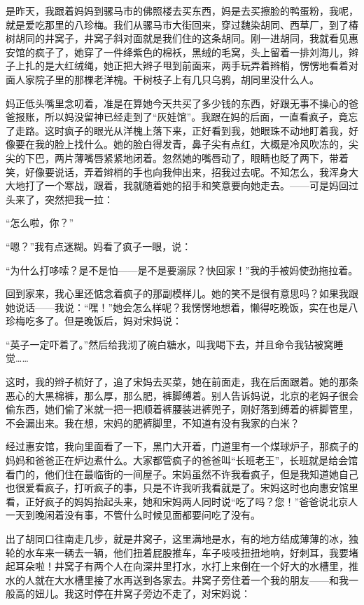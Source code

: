 \par 是昨天，我跟着妈妈到骡马市的佛照楼去买东西，妈是去买擦脸的鸭蛋粉，我呢，就是爱吃那里的八珍梅。我们从骡马市大街回来，穿过魏染胡同、西草厂，到了椿树胡同的井窝子，井窝子斜对面就是我们住的这条胡同。刚一进胡同，我就看见惠安馆的疯子了，她穿了一件绛紫色的棉袄，黑绒的毛窝，头上留着一排刘海儿，辫子上扎的是大红绒绳，她正把大辫子甩到前面来，两手玩弄着辫梢，愣愣地看着对面人家院子里的那棵老洋槐。干树枝子上有几只乌鸦，胡同里没什么人。
\par 妈正低头嘴里念叨着，准是在算她今天共买了多少钱的东西，好跟无事不操心的爸爸报账，所以妈没留神已经走到了“灰娃馆”。我跟在妈的后面，一直看疯子，竟忘了走路。这时疯子的眼光从洋槐上落下来，正好看到我，她眼珠不动地盯着我，好像要在我的脸上找什么。她的脸白得发青，鼻子尖有点红，大概是冷风吹冻的，尖尖的下巴，两片薄嘴唇紧紧地闭着。忽然她的嘴唇动了，眼睛也眨了两下，带着笑，好像要说话，弄着辫梢的手也向我伸出来，招我过去呢。不知怎么，我浑身大大地打了一个寒战，跟着，我就随着她的招手和笑意要向她走去。——可是妈回过头来了，突然把我一拉：
\par “怎么啦，你？”
\par “嗯？”我有点迷糊。妈看了疯子一眼，说：
\par “为什么打哆嗦？是不是怕——是不是要溺尿？快回家！”我的手被妈使劲拖拉着。
\par 回到家来，我心里还惦念着疯子的那副模样儿。她的笑不是很有意思吗？如果我跟她说话——我说：“嘿！”她会怎么样呢？我愣愣地想着，懒得吃晚饭，实在也是八珍梅吃多了。但是晚饭后，妈对宋妈说：
\par “英子一定吓着了。”然后给我沏了碗白糖水，叫我喝下去，并且命令我钻被窝睡觉……
\par 这时，我的辫子梳好了，追了宋妈去买菜，她在前面走，我在后面跟着。她的那条恶心的大黑棉裤，那么厚，那么肥，裤脚缚着。别人告诉妈说，北京的老妈子很会偷东西，她们偷了米就一把一把顺着裤腰装进裤兜子，刚好落到缚着的裤脚管里，不会漏出来。我在想，宋妈的肥裤脚里，不知道有没有我家的白米？
\par 经过惠安馆，我向里面看了一下，黑门大开着，门道里有一个煤球炉子，那疯子的妈妈和爸爸正在炉边煮什么。大家都管疯子的爸爸叫“长班老王”，长班就是给会馆看门的，他们住在最临街的一间屋子。宋妈虽然不许我看疯子，但是我知道她自己也很爱看疯子，打听疯子的事，只是不许我听我看就是了。宋妈这时也向惠安馆里看，正好疯子的妈妈抬起头来，她和宋妈两人同时说“吃了吗？您！”爸爸说北京人一天到晚闲着没有事，不管什么时候见面都要问吃了没有。
\par 出了胡同口往南走几步，就是井窝子，这里满地是水，有的地方结成薄薄的冰，独轮的水车来一辆去一辆，他们扭着屁股推车，车子吱吱扭扭地响，好刺耳，我要堵起耳朵啦！井窝子有两个人在向深井里打水，水打上来倒在一个好大的水槽里，推水的人就在大水槽里接了水再送到各家去。井窝子旁住着一个我的朋友——和我一般高的妞儿。我这时停在井窝子旁边不走了，对宋妈说：
